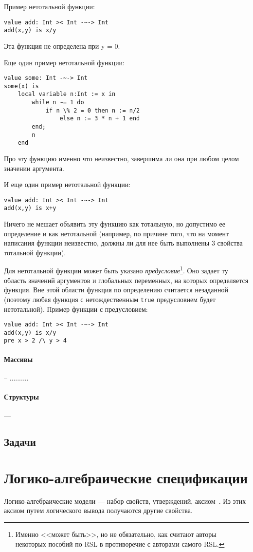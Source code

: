 \documentclass[14pt]{extreport}
\newcommand{\head}[1]{\vspace{1cm}\subsubsection{#1}}
\begin{document}
Пример нетотальной функции:
\begin{lstlisting}
value add: Int >< Int -~-> Int
add(x,y) is x/y
\end{lstlisting}
Эта функция не определена при y = 0.

Еще один пример нетотальной функции:
\begin{lstlisting}
value some: Int -~-> Int
some(x) is
    local variable n:Int := x in
        while n ~= 1 do
            if n \% 2 = 0 then n := n/2
                else n := 3 * n + 1 end
        end;
        n
    end
\end{lstlisting}
Про эту функцию именно что неизвестно, завершима ли она при любом целом значении аргумента.

И еще один пример нетотальной функции:
\begin{lstlisting}
value add: Int >< Int -~-> Int
add(x,y) is x+y
\end{lstlisting}
Ничего не мешает объявить эту функцию как тотальную, но допустимо ее определение и как нетотальной (например, по причине того, что на момент написания функции неизвестно, должны ли для нее быть выполнены 3 свойства тотальной функции).

Для нетотальной функции может быть указано \emph{предусловие}\footnote{Именно <<может быть>>, но не обязательно, как считают авторы некоторых пособий по RSL в противоречие с авторами самого RSL.}. Оно задает ту область значений аргументов и глобальных переменных, на которых определяется функция. Вне этой области функция по определению считается незаданной (поэтому любая функция с нетождественным \texttt{true} предусловием будет нетотальной). Пример функции с предусловием:
\begin{lstlisting}
value add: Int >< Int -~-> Int
add(x,y) is x/y
pre x > 2 /\ y > 4
\end{lstlisting}


\head{Массивы} -- ..........

\head{Структуры} ---

\section*{Задачи}



\chapter{Логико-алгебраические спецификации}

Логико-алгебраические модели --- набор свойств, утверждений, аксиом~\cite{kuliamin}. Из этих аксиом путем логического вывода получаются другие свойства.
\end{document}
